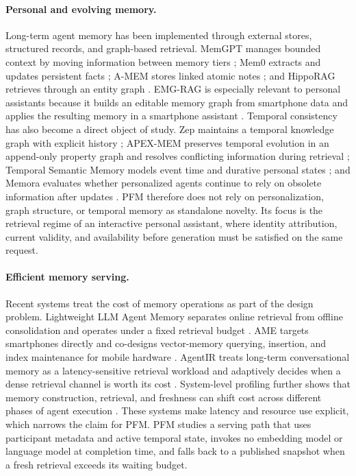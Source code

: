 \documentclass[letterpaper]{article} %
\begin{document}
\paragraph{Personal and evolving memory.} Long-term agent memory has been implemented through external stores, structured records, and graph-based retrieval. MemGPT manages bounded context by moving information between memory tiers \citep{packer2023memgpt}; Mem0 extracts and updates persistent facts \citep{chhikara2025mem0}; A-MEM stores linked atomic notes \citep{xu2025amem}; and HippoRAG retrieves through an entity graph \citep{gutierrez2024hipporag}. EMG-RAG is especially relevant to personal assistants because it builds an editable memory graph from smartphone data and applies the resulting memory in a smartphone assistant \citep{wang2024emgrag}. Temporal consistency has also become a direct object of study. Zep maintains a temporal knowledge graph with explicit history \citep{rasmussen2025zep}; APEX-MEM preserves temporal evolution in an append-only property graph and resolves conflicting information during retrieval \citep{banerjee2026apexmem}; Temporal Semantic Memory models event time and durative personal states \citep{su2026tsm}; and Memora evaluates whether personalized agents continue to rely on obsolete information after updates \citep{uddin2026memora}. PFM therefore does not rely on personalization, graph structure, or temporal memory as standalone novelty. Its focus is the retrieval regime of an interactive personal assistant, where identity attribution, current validity, and availability before generation must be satisfied on the same request.

\paragraph{Efficient memory serving.} Recent systems treat the cost of memory operations as part of the design problem. Lightweight LLM Agent Memory separates online retrieval from offline consolidation and operates under a fixed retrieval budget \citep{zhang2026lightmem}. AME targets smartphones directly and co-designs vector-memory querying, insertion, and index maintenance for mobile hardware \citep{zhao2025ame}. AgentIR treats long-term conversational memory as a latency-sensitive retrieval workload and adaptively decides when a dense retrieval channel is worth its cost \citep{yuan2026agentir}. System-level profiling further shows that memory construction, retrieval, and freshness can shift cost across different phases of agent execution \citep{omri2026agentmemory,zhou2026ready}. These systems make latency and resource use explicit, which narrows the claim for PFM. PFM studies a serving path that uses participant metadata and active temporal state, invokes no embedding model or language model at completion time, and falls back to a published snapshot when a fresh retrieval exceeds its waiting budget.
\end{document}
